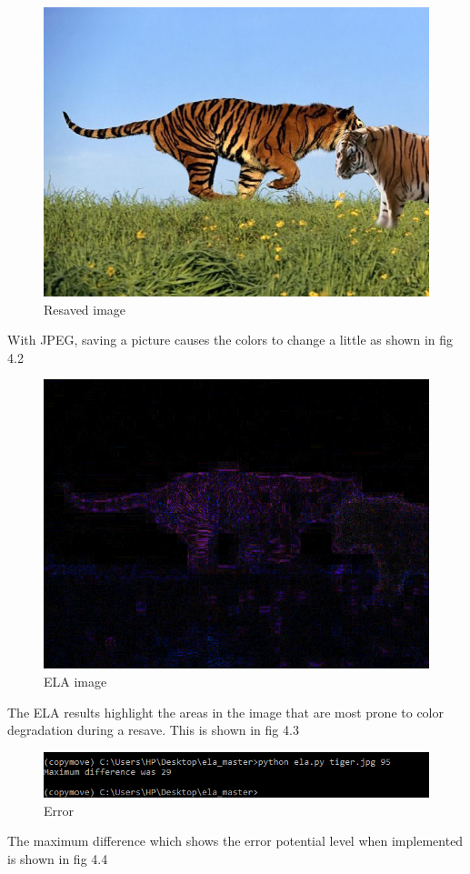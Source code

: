 \begin{figure}[h!]
\centering
\includegraphics[width=12cm]{Figures/tiger_resaved.jpg}
\caption{Resaved image}
\label{fig:lion}
\end{figure}
With JPEG, saving a picture causes the colors to change a little as shown in fig 4.2

\begin{figure}[h!]
\centering
\includegraphics[width=12cm]{Figures/tiger_ela.png}
\caption{ELA image}
\label{fig:lion}
\end{figure}

\newpage
The ELA results highlight the areas in the image that are most prone to color degradation during a resave. This is shown in fig 4.3

\begin{figure}[h!]
\centering
\includegraphics[width=16cm]{Figures/ela-cmd.PNG}
\caption{Error}
\label{fig:lion}
\end{figure}
The maximum difference which shows the error potential level when implemented is shown in fig 4.4

